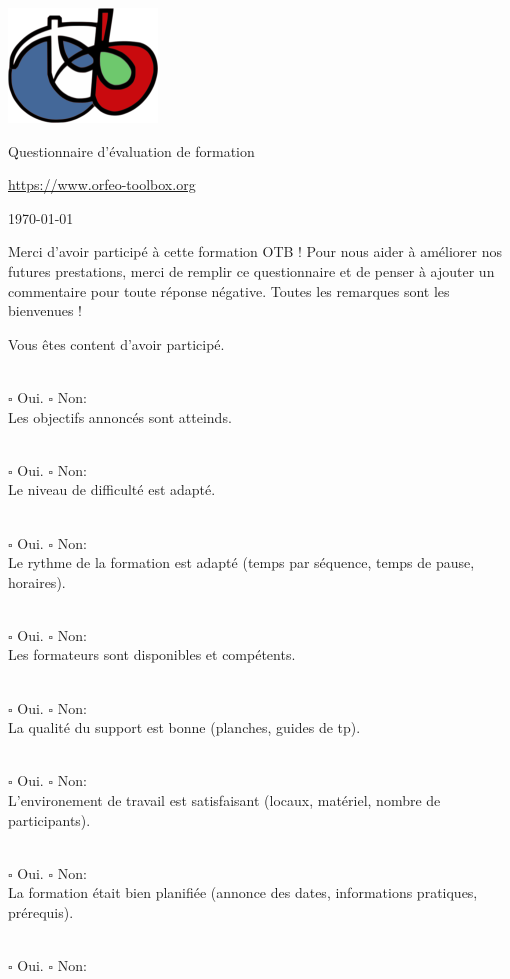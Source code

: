\documentclass[10pt,a4paper]{article}
\newcommand{\answer}{
\\ \quad $\square$ Oui. \quad $\square$ Non:\\
}
\begin{document}
\begin{center}
\includegraphics[scale=0.5]{Art/otb-logo.png}

Questionnaire d'évaluation de formation

{\small\url{https://www.orfeo-toolbox.org}}

\today
\end{center}

\begin{center}
\begin{minipage}{.8\textwidth}
Merci d'avoir participé à cette formation OTB ! Pour nous aider à améliorer
nos futures prestations, merci de remplir ce questionnaire et de penser à
ajouter un commentaire pour toute réponse négative. Toutes les remarques
sont les bienvenues !
\end{minipage}
\end{center}

Vous êtes content d'avoir participé.
\answer

Les objectifs annoncés sont atteinds.
\answer

Le niveau de difficulté est adapté.
\answer

Le rythme de la formation est adapté (temps par séquence, temps de pause,
horaires).
\answer

Les formateurs sont disponibles et compétents.
\answer

La qualité du support est bonne (planches, guides de tp).
\answer

L'environement de travail est satisfaisant (locaux, matériel, nombre de
participants).
\answer

La formation était bien planifiée (annonce des dates, informations pratiques,
prérequis).
\answer

\newcommand{\moduleanswer}{
\\
\begin{tabular}{rlll}  
  Difficulté:         & $\square$ Adaptée & $\square$ Trop difficile & $\square$
  Trop facile\\
  Temps alloué:       & $\square$ Adapté  & $\square$ Manque de temps pour tout
  faire & $\square$ Manque de choses à faire\\
  Qualité du support: & $\square$ Bonne & $\square$ À améliorer: & \\
  Commentaire: &&&\\
  &&&\\
  &&&\\
\end{tabular}
}
\end{document}
